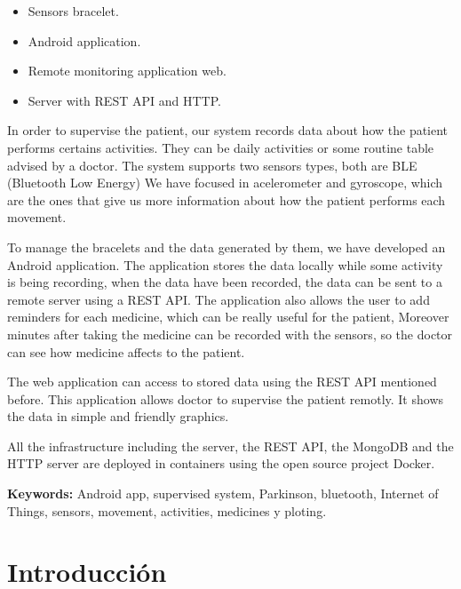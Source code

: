 \documentclass[11pt,spanish]{article}
\newcommand\blankpage{%
    \null
    \thispagestyle{empty}%
    \addtocounter{page}{-1}%
    \newpage}
\begin{document}
\begin{itemize}
	\item Sensors bracelet.
    \item Android application.
    \item Remote monitoring application web.
    \item Server with REST API and HTTP.
\end{itemize}

In order to supervise the patient, our system records data about how the patient performs certains activities. They can be daily activities or some routine table advised by a doctor. The system supports two sensors types, both are BLE (Bluetooth Low Energy) We have focused in acelerometer and gyroscope, which are the ones that give us more information about how the patient performs each movement.
\newline

To manage the bracelets and the data generated by them, we have developed an Android application. The application stores the data locally while some activity is being recording, when the data have been recorded, the data can be sent to a remote server using a REST API. The application also allows the user to add reminders for each medicine, which can be really useful for the patient, Moreover minutes after taking the medicine can be recorded with the sensors, so the doctor can see how medicine affects to the patient.
\newline

The web application can access to stored data using the REST API mentioned before. This application allows doctor to supervise the patient remotly. It shows the data in simple and friendly graphics.
\newline

All the infrastructure including the server, the REST API, the MongoDB and the HTTP server are deployed in containers using the open source project Docker.
\newline

{\bf Keywords:} Android app, supervised system, Parkinson, bluetooth, Internet of Things, sensors, movement, activities, medicines y ploting.

\newpage
\blankpage


\newpage
\tableofcontents
\newpage
\listoffigures
\newpage
\section{Introducción}
\end{document}

